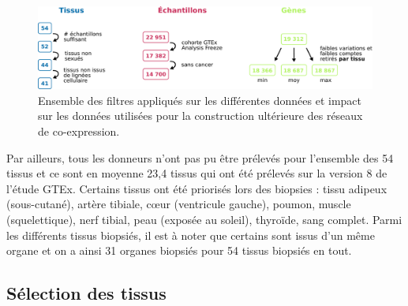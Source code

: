 \begin{figure}
    \centering
    \includegraphics[width=1\textwidth]{img/chap2/chap2_filtre_donnees.pdf}
    \caption{Ensemble des filtres appliqués sur les différentes données et impact sur les données utilisées pour la construction ultérieure des réseaux de co-expression.}
    \label{figure:data_filters}
\end{figure}

Par ailleurs, tous les donneurs n'ont pas pu être prélevés pour l'ensemble des 54 tissus et ce sont en moyenne 23,4 tissus qui ont été prélevés sur la version 8 de l'étude GTEx. Certains tissus ont été priorisés lors des biopsies : tissu adipeux (sous-cutané), artère tibiale, cœur (ventricule gauche), poumon, muscle (squelettique), nerf tibial, peau (exposée au soleil), thyroïde, sang complet. Parmi les différents tissus biopsiés, il est à noter que certains sont issus d'un même organe et on a ainsi 31 organes biopsiés pour 54 tissus biopsiés en tout.



\subsection{Sélection des tissus}

